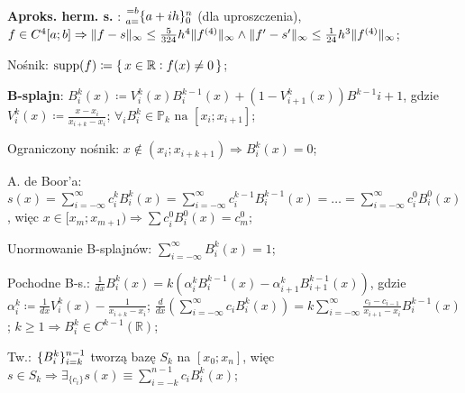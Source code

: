 \entry
\textbf{Aproks. herm. s. \mancube}:
$\ipoints[0][n][a=][=b]{a+ih}$
(dla uproszczenia),
$
f\in C^{4}[a;b]
\Rightarrow
\|f-s\|_\infty \leq \frac{5}{324} h^4 \|f^{(4)}\|_\infty
\wedge
\|f'-s'\|_\infty \leq \frac{1}{24} h^3 \|f^{(4)}\|_\infty
$;


\entry
Nośnik:
$\mathrm{supp}(f) \coloneqq \set{x \in \mathbb{R}: f(x) \neq 0}$;

\entry
\textbf{B-splajn}:
$B_i^k(x) \coloneqq V_i^k(x) B_i^{k-1}(x) + (1 - V^k_{i+1}(x)) B^{k-1}{i+1}$,
gdzie
$V_i^k(x) \coloneqq \frac{x-x_i}{x_{i+k} - x_i}$;
\entry
$\forall_i B_i^k \in \mathbb{P}_{k} \text{ na } [x_i; x_{i+1}]$;


\entry
Ograniczony nośnik:
$x \notin (x_i; x_{i+k+1}) \Rightarrow B^k_i(x)=0$;

\entry
A. de Boor'a:
$
s(x) =
\sum_{i=-\infty}^{\infty} c_i^k B^k_i (x) =
\sum_{i=-\infty}^{\infty} c_i^{k-1} B^{k-1}_i (x) =
\ldots =
\sum_{i=-\infty}^{\infty} c_i^{0} B^{0}_i (x)
$,
więc
$x\in [x_m; x_{m+1}) \Rightarrow \sum c^0_i B^0_i(x) = c_m^0$;

\entry
Unormowanie B-splajnów:
$\sum_{i = -\infty}^\infty B_i^k(x) = 1$;

\entry
Pochodne B-s.:
$\frac{1}{dx}B_i^k(x) = k (\alpha^k_i B_i^{k-1}(x) - \alpha^k_{i+1} B^{k-1}_{i+1}(x))$,
gdzie
$\alpha_i^k \coloneqq \frac{1}{dx}V_i^k(x) - \frac{1}{x_{i+k} - x_i}$;
\entry
$
\frac{d}{dx}(\sum_{i = -\infty}^\infty c_i B_i^k(x) ) =
k \sum_{i = -\infty}^\infty \frac{ c_i - c_{i-1} }{ x_{i+1} - x_i } B^{k-1}_i(x)
$;
\entry
$k \geq 1 \Rightarrow B_i^k \in C^{k-1}(\mathbb{R})$;

\entry
Tw.:
$\ipoints[i=k][n-1]{B_i^k}$
tworzą bazę $S_k$ na $[x_0; x_n]$,
więc
$s \in S_k \Rightarrow \exists_{\{c_i\}} s(x) \equiv \sum_{i=-k}^{n-1} c_i B_i^k(x)$;
